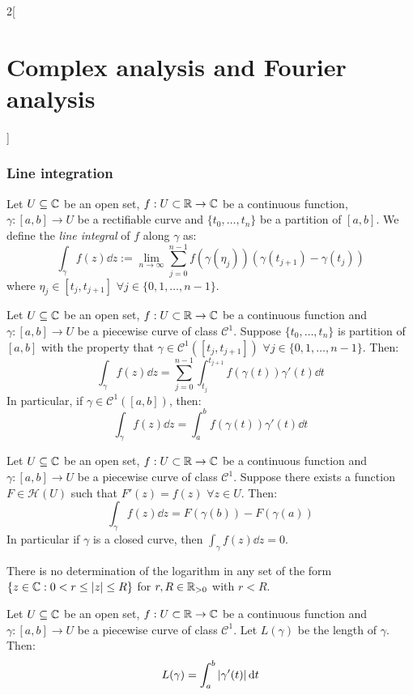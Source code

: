 \documentclass[../../../main.tex]{subfiles}
\begin{document}
\begin{multicols}{2}[\section{Complex analysis and Fourier analysis}]
  \subsubsection{Line integration}
  \begin{definition}
    Let $U\subseteq \mathbb{C}$ be an open set, $f:U\subset\mathbb{R}\rightarrow\mathbb{C}$ be a continuous function, $\gamma:[a,b]\rightarrow U$ be a rectifiable curve and $\{t_0,\ldots,t_n\}$ be a partition of $[a,b]$. We define the \emph{line integral} of $f$ along $\gamma$ as: $$\int_\gamma f(z)\dd{z}:=\lim_{n\to\infty}\sum_{j=0}^{n-1}f(\gamma(\eta_j))(\gamma(t_{j+1})-\gamma(t_j))$$ where $\eta_j\in[t_j,t_{j+1}]$ $\forall j\in\{0,1,\ldots,n-1\}$.
  \end{definition}
  \begin{definition}
    Let $U\subseteq \mathbb{C}$ be an open set, $f:U\subset\mathbb{R}\rightarrow\mathbb{C}$ be a continuous function and $\gamma:[a,b]\rightarrow U$ be a piecewise curve of class $\mathcal{C}^1$. Suppose $\{t_0,\ldots,t_n\}$ is partition of $[a,b]$ with the property that $\gamma\in\mathcal{C}^1([t_j,t_{j+1}])$ $\forall j\in\{0,1,\ldots,n-1\}$. Then: $$\int_\gamma f(z)\dd{z}=\sum_{j=0}^{n-1}\int_{t_j}^{t_{j+1}}f(\gamma(t))\gamma'(t)\dd{t}$$
    In particular, if $\gamma\in\mathcal{C}^1([a,b])$, then: $$\int_\gamma f(z)\dd{z}=\int_a^bf(\gamma(t))\gamma'(t)\dd{t}$$
  \end{definition}
  \begin{theorem}
    Let $U\subseteq \mathbb{C}$ be an open set, $f:U\subset\mathbb{R}\rightarrow\mathbb{C}$ be a continuous function and $\gamma:[a,b]\rightarrow U$ be a piecewise curve of class $\mathcal{C}^1$. Suppose there exists a function $F\in\mathcal{H}(U)$ such that $F'(z)=f(z)$ $\forall z\in U$. Then:
    $$\int_\gamma f(z)\dd{z}=F(\gamma(b))-F(\gamma(a))$$ In particular if $\gamma$ is a closed curve, then $\int_\gamma f(z)\dd{z}=0$.
  \end{theorem}
  \begin{corollary}
    There is no determination of the logarithm in any set of the form $\{z\in\mathbb{C}:0<r\leq\abs{z}\leq R\}$ for $r,R\in\mathbb{R}_{> 0}$ with $r<R$.
  \end{corollary}
  \begin{proposition}
    Let $U\subseteq \mathbb{C}$ be an open set, $f:U\subset\mathbb{R}\rightarrow\mathbb{C}$ be a continuous function and $\gamma:[a,b]\rightarrow U$ be a piecewise curve of class $\mathcal{C}^1$. Let $L(\gamma)$ be the length of $\gamma$. Then: $$L(\gamma)=\int_a^b\abs{\gamma'(t)}\dd{t}$$
  \end{proposition}
  \begin{proposition}

\end{proposition}
\end{multicols}
\end{document}
